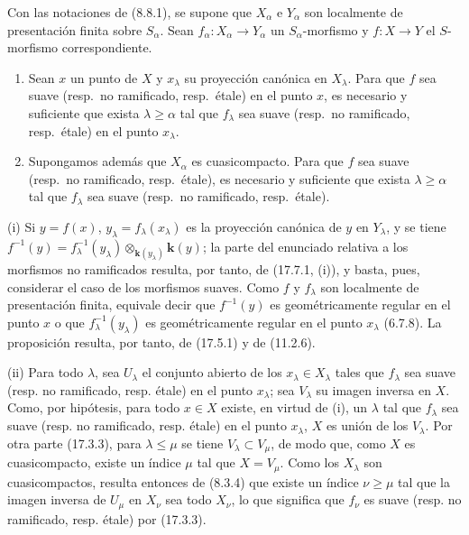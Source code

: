 \begin{proposition}[17.7.8]
\label{IV.17.7.8}
Con las notaciones de \textup{(8.8.1)}, se supone que $X_\alpha$ e $Y_\alpha$ son localmente de presentación finita sobre $S_\alpha$. Sean $f_\alpha:X_\alpha\to Y_\alpha$ un $S_\alpha$-morfismo y $f:X\to Y$ el $S$-morfismo correspondiente.
\begin{enumerate}
  \item[\textup{(i)}] Sean $x$ un punto de $X$ y $x_\lambda$ su proyección canónica en $X_\lambda$. Para que $f$ sea suave \textup{(resp.}\ no ramificado, \textup{resp.}\ étale\textup{)} en el punto $x$, es necesario y suficiente que exista $\lambda\geq\alpha$ tal que $f_\lambda$ sea suave \textup{(resp.}\ no ramificado, \textup{resp.}\ étale\textup{)} en el punto $x_\lambda$.
  \item[\textup{(ii)}] Supongamos además que $X_\alpha$ es cuasicompacto. Para que $f$ sea suave \textup{(resp.}\ no ramificado, \textup{resp.}\ étale\textup{)}, es necesario y suficiente que exista $\lambda\geq\alpha$ tal que $f_\lambda$ sea suave \textup{(resp.}\ no ramificado, \textup{resp.}\ étale\textup{)}.
\end{enumerate}
\end{proposition}

(i) Si $y=f(x)$, $y_\lambda=f_\lambda(x_\lambda)$ es la proyección canónica de $y$ en $Y_\lambda$, y se tiene $f^{-1}(y)=f_\lambda^{-1}(y_\lambda)\otimes_{\mathbf{k}(y_\lambda)}\boldsymbol{k}(y)$; la parte del enunciado relativa a los morfismos no ramificados resulta, por tanto, de (17.7.1, (i)), y basta, pues, considerar el caso de los morfismos suaves. Como $f$ y $f_\lambda$ son localmente de presentación finita, equivale decir que $f^{-1}(y)$ es geométricamente regular en el punto $x$ o que $f_\lambda^{-1}(y_\lambda)$ es geométricamente regular en el punto $x_\lambda$ (6.7.8). La proposición resulta, por tanto, de (17.5.1) y de (11.2.6).

(ii) Para todo $\lambda$, sea $U_\lambda$ el conjunto abierto de los $x_\lambda\in X_\lambda$ tales que $f_\lambda$ sea suave (resp. no ramificado, resp. étale) en el punto $x_\lambda$; sea $V_\lambda$ su imagen inversa en $X$. Como, por hipótesis, para todo $x\in X$ existe, en virtud de (i), un $\lambda$ tal que $f_\lambda$ sea suave (resp. no ramificado, resp. étale) en el punto $x_\lambda$, $X$ es unión de los $V_\lambda$. Por otra parte (17.3.3), para $\lambda\leq\mu$ se tiene $V_\lambda\subset V_\mu$, de modo que, como $X$ es cuasicompacto, existe un índice $\mu$ tal que $X=V_\mu$. Como los $X_\lambda$ son cuasicompactos, resulta entonces de (8.3.4) que existe un índice $\nu\geq\mu$ tal que la imagen inversa de $U_\mu$ en $X_\nu$ sea todo $X_\nu$, lo que significa que $f_\nu$ es suave (resp. no ramificado, resp. étale) por (17.3.3).

